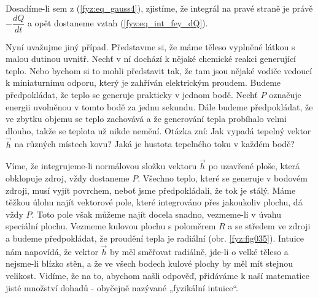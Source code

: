 {      Dosadíme-li sem z (\ref{fyz:eq_gauss4}), zjistíme, že integrál na pravé straně je právě
      \(-\dfrac{dQ}{dt}\) a opět dostaneme vztah (\ref{fyz:eq_int_fey_dQ}).
      
      Nyní uvažujme jiný případ. Představme si, že máme těleso vyplněné látkou s malou dutinou 
      uvnitř. Nechť v ní dochází k nějaké chemické reakci generující teplo. Nebo bychom si to mohli 
      představit tak, že tam jsou nějaké vodiče vedoucí k miniaturnímu odporu, který je zahříván 
      elektrickým proudem. Budeme předpokládat, že teplo se generuje prakticky v jednom bodě. Nechť 
      \(P\) označuje energii uvolněnou v tomto bodě za jednu sekundu. Dále budeme předpokládat, že 
      ve zbytku objemu se teplo zachovává a že generování tepla probíhalo velmi dlouho, takže se 
      teplota už nikde nemění. Otázka zní: Jak vypadá tepelný vektor \(\vec{h}\) na různých místech 
      kovu? Jaká je hustota tepelného toku v každém bodě?
      
      Víme, že integrujeme-li normálovou složku vektoru \(\vec{h}\) po uzavřené ploše, která 
      obklopuje zdroj, vždy dostaneme \(P\). Všechno teplo, které se generuje v bodovém zdroji, 
      musí vyjít povrchem, neboť jsme předpokládali, že tok je stálý. Máme těžkou úlohu najít 
      vektorové pole, které integrováno přes jakoukoliv plochu, dá vždy \(P\). Toto pole však 
      můžeme najít docela snadno, vezmeme-li v úvahu speciální plochu. Vezmeme kulovou plochu s 
      poloměrem \(R\) a se středem ve zdroji a budeme předpokládat, že proudění tepla je radiální 
      (obr. \ref{fyz:fig035}). Intuice nám napovídá, že vektor \(\vec{h}\) by měl 
      směřovat radiálně, jde-li o velké těleso a nejsme-li blízko stěn, a že ve všech bodech kulové 
      plochy by měl mít stejnou velikost. Vidíme, že na to, abychom našli odpověď, přidáváme k naší 
      matematice jisté množství dohadů - obyčejně nazývané „fyzikální intuice“.

}

